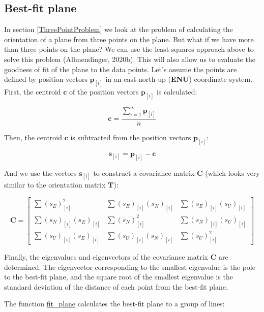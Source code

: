 \documentclass[a4paper , 12pt]{book}
\begin{document}
\subsection{Best-fit plane}

In section \ref{ThreePointProblem} we look at the problem of calculating the orientation of a plane from three points on the plane. But what if we have more than three points on the plane? We can use the least squares approach above to solve this problem (Allmendinger, 2020b). This will also allow us to evaluate the goodness of fit of the plane to the data points. Let's assume the points are defined by position vectors $\mathbf{p}_{[i]}$ in an east-north-up (\textbf{ENU}) coordinate system. First, the centroid $\mathbf{c}$ of the position vectors $\mathbf{p}_{[i]}$ is calculated:

\begin{equation}
    \mathbf{c}=\frac{\sum_{i=1}^{n}\mathbf{p}_{[i]}}{n}
\end{equation}

Then, the centroid $\mathbf{c}$ is subtracted from the position vectors $\mathbf{p}_{[i]}$:

\begin{equation}
    \mathbf{s}_{[i]}=\mathbf{p}_{[i]}-\mathbf{c}
\end{equation}

And we use the vectors $\mathbf{s}_{[i]}$ to construct a covariance matrix $\mathbf{C}$ (which looks very similar to the orientation matrix $\mathbf{T}$):

\begin{equation}
    \mathbf{C}=\left[\begin{array}{ccc}\sum (s_E)_{[i]}^{2}  & \sum (s_E)_{[i]} (s_N)_{[i]} & \sum (s_E)_{[i]} (s_U)_{[i]} \\ \sum (s_N)_{[i]} (s_E)_{[i]} & \sum (s_N)_{[i]}^{2} & \sum (s_N)_{[i]} (s_U)_{[i]} \\ \sum (s_U)_{[i]} (s_E)_{[i]} & \sum (s_U)_{[i]} (s_N)_{[i]} & \sum (s_U)_{[i]}^{2}\end{array}\right]
\end{equation}

Finally, the eigenvalues and eigenvectors of the covariance matrix $\mathbf{C}$ are determined. The eigenvector corresponding to the smallest eigenvalue is the pole to the best-fit plane, and the square root of the smallest eigenvalue is the standard deviation of the distance of each point from the best-fit plane.

The function \href{https://github.com/nfcd/compGeo/blob/master/source/functions/fit_plane.py}{fit\_plane} calculates the best-fit plane to a group of lines:
\end{document}
